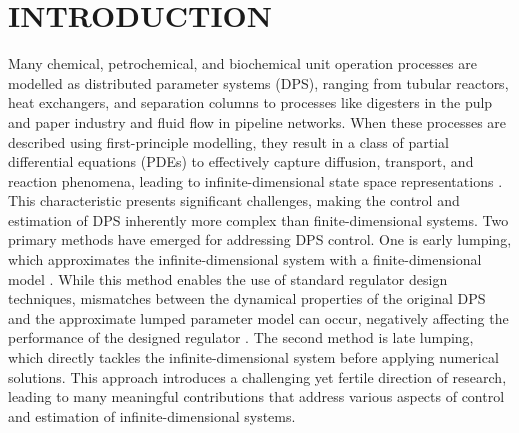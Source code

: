 \section{INTRODUCTION}

Many chemical, petrochemical, and biochemical unit operation processes are modelled as distributed parameter systems (DPS), ranging from tubular reactors, heat exchangers, and separation columns to processes like digesters in the pulp and paper industry and fluid flow in pipeline networks. When these processes are described using first-principle modelling, they result in a class of partial differential equations (PDEs) to effectively capture diffusion, transport, and reaction phenomena, leading to infinite-dimensional state space representations \autocite{ray1981advanced}. This characteristic presents significant challenges, making the control and estimation of DPS inherently more complex than finite-dimensional systems. Two primary methods have emerged for addressing DPS control. One is early lumping, which approximates the infinite-dimensional system with a finite-dimensional model \autocite{davison1976robust, francis1977linear}. While this method enables the use of standard regulator design techniques, mismatches between the dynamical properties of the original DPS and the approximate lumped parameter model can occur, negatively affecting the performance of the designed regulator \autocite{moghadam2012infinite}. The second method is late lumping, which directly tackles the infinite-dimensional system before applying numerical solutions. This approach introduces a challenging yet fertile direction of research, leading to many meaningful contributions that address various aspects of control and estimation of infinite-dimensional systems.

